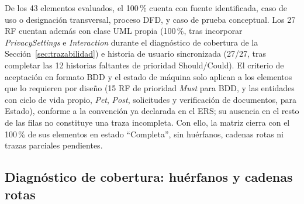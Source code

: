 \documentclass[journal,onecolumn]{IEEEtran}
\begin{document}
De los 43 elementos evaluados, el 100\,\% cuenta con fuente identificada,
caso de uso o designación transversal, proceso DFD, y caso de prueba
conceptual. Los 27 RF cuentan además con clase UML propia (100\,\%, tras
incorporar \textit{PrivacySettings} e \textit{Interaction} durante el
diagnóstico de cobertura de la Sección~\ref{sec:trazabilidad}) e historia
de usuario sincronizada (27/27, tras completar las 12 historias faltantes
de prioridad Should/Could). El criterio de aceptación en formato BDD y el
estado de máquina solo aplican a los elementos que lo requieren por
diseño (15 RF de prioridad \textit{Must} para BDD, y las entidades con
ciclo de vida propio, \textit{Pet}, \textit{Post}, solicitudes y
verificación de documentos, para Estado), conforme a la convención ya
declarada en el ERS; su ausencia en el resto de las filas no constituye
una traza incompleta. Con ello, la matriz cierra con el 100\,\% de sus
elementos en estado ``Completa'', sin huérfanos, cadenas rotas ni trazas
parciales pendientes.

\subsection{Diagnóstico de cobertura: huérfanos y cadenas rotas}
\end{document}
